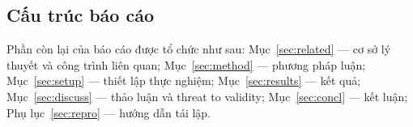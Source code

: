 \subsection{Cấu trúc báo cáo}
Phần còn lại của báo cáo được tổ chức như sau: Mục~\ref{sec:related} — cơ sở lý thuyết và công trình liên quan; Mục~\ref{sec:method} — phương pháp luận; Mục~\ref{sec:setup} — thiết lập thực nghiệm; Mục~\ref{sec:results} — kết quả; Mục~\ref{sec:discuss} — thảo luận và threat to validity; Mục~\ref{sec:concl} — kết luận; Phụ lục~\ref{sec:repro} — hướng dẫn tái lập.
